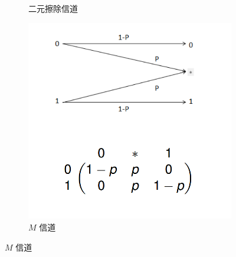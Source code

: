 \begin{solution}
\begin{figure}[h]
\begin{subfigure}[b]{0.3\textwidth}
    \caption{二元擦除信道}
    \label{fig:image2}
  \end{subfigure}
  \hfill
  \begin{subfigure}[b]{0.3\textwidth}
    \includegraphics[width=\textwidth]{image/10.png}
    \caption{$ M $ 信道}
    \label{fig:image3}
  \end{subfigure}
  \label{fig:three_images}
\end{figure}
\end{solution}

